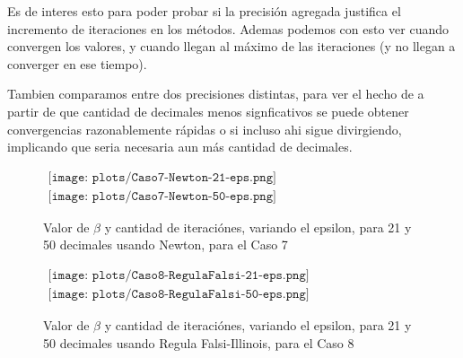 Es de interes esto para poder probar si la precisi\'on agregada justifica el incremento
de iteraciones en los m\'etodos. Ademas podemos con esto ver cuando convergen los valores, y
cuando llegan al m\'aximo de las iteraciones (y no llegan a converger en ese tiempo).

Tambien comparamos entre dos precisiones distintas, para ver el hecho de a partir de que 
cantidad de decimales menos signficativos se puede obtener convergencias razonablemente 
r\'apidas o si incluso ahi sigue divirgiendo, implicando que seria necesaria aun m\'as cantidad
de decimales.


\begin{figure} [H]
$\begin{array}{c}
\texttt{[image: plots/Caso7-Newton-21-eps.png]} \\
\texttt{[image: plots/Caso7-Newton-50-eps.png]}
\end{array}$
\label{fig:Newton-Eps-Caso4}
\caption{Valor de $\beta$ y cantidad de iteraci\'ones, variando el epsilon, para 21 y 50 
decimales usando Newton, para el Caso 7}
\end{figure}


\begin{figure} [H]
$\begin{array}{c}
\texttt{[image: plots/Caso8-RegulaFalsi-21-eps.png]} \\
\texttt{[image: plots/Caso8-RegulaFalsi-50-eps.png]}
\end{array}$
\label{fig:RegulaFalsi-Eps-Caso4}
\caption{Valor de $\beta$ y cantidad de iteraci\'ones, variando el epsilon, para 21 y 50 
decimales usando Regula Falsi-Illinois, para el Caso 8}
\end{figure}

